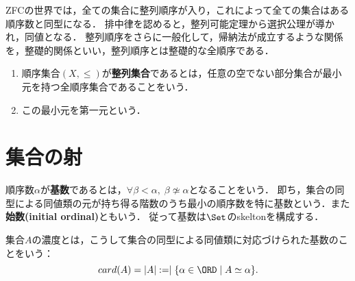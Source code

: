 \documentclass[uplatex,dvipdfmx]{jsreport}
\begin{document}
\begin{tcolorbox}[colframe=ForestGreen, colback=ForestGreen!10!white,breakable,colbacktitle=ForestGreen!40!white,coltitle=black,fonttitle=\bfseries\sffamily,
title=]
    ZFCの世界では，全ての集合に整列順序が入り，これによって全ての集合はある順序数と同型になる．
    排中律を認めると，整列可能定理から選択公理が導かれ，同値となる．
    整列順序をさらに一般化して，帰納法が成立するような関係を，整礎的関係といい，整列順序とは整礎的な全順序である．
\end{tcolorbox}

\begin{definition}\mbox{}
    \begin{enumerate}
        \item 順序集合$(X,\le)$が\textbf{整列集合}であるとは，任意の空でない部分集合が最小元を持つ全順序集合であることをいう．
        \item この最小元を第一元という．
    \end{enumerate}
\end{definition}

\section{集合の射}

\begin{definition}
    順序数$\alpha$が\textbf{基数}であるとは，$\forall\beta<\alpha,\;\beta\not\simeq\alpha$となることをいう．
    即ち，集合の同型による同値類の元が持ち得る階数のうち最小の順序数を特に基数という．また\textbf{始数(initial ordinal)}ともいう．
    従って基数は$\Set$のskeltonを構成する．

    集合$A$の濃度とは，こうして集合の同型による同値類に対応づけられた基数のことをいう：
    \[card(A)=|A|:=\mid\{\alpha\in\ORD\mid A\simeq\alpha\}.\]
\end{definition}
\end{document}
